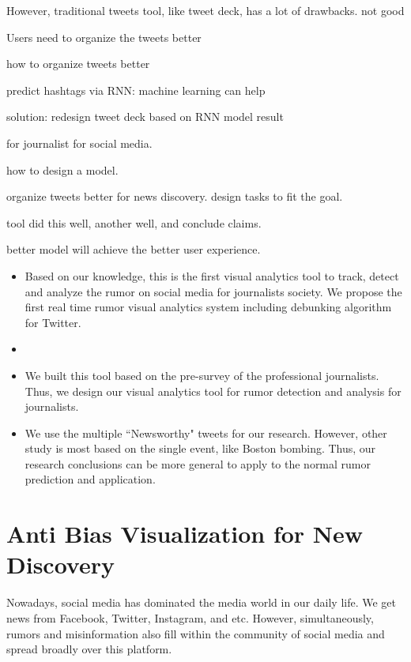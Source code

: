 However, traditional tweets tool, like tweet deck, has a lot of drawbacks.  not good

Users need to organize the tweets better

how to organize tweets better

predict hashtags via RNN: machine learning can help

solution: redesign tweet deck based on RNN model result

for journalist for social media. 

how to design a model. 



organize tweets better for news discovery. design tasks to fit the goal. 

tool did this well, another well, and conclude claims. 


better model will achieve the better user experience.  



\begin{itemize}
  \item Based on our knowledge, this is the first visual analytics tool to track, detect and analyze the rumor on social media for journalists society. We propose the first real time rumor visual analytics system including debunking algorithm for Twitter.

 \item 
  
  \item We built this tool based on the pre-survey of the professional journalists. Thus, we design our visual analytics tool for rumor detection and analysis for journalists. 
  
  \item We use the multiple ``Newsworthy" tweets for our research. However, other study is most based on the single event, like Boston bombing. Thus, our research conclusions can be more general to apply to the normal rumor prediction and application. 
\end{itemize}



\section{Anti Bias Visualization for New Discovery}

Nowadays, social media has dominated the media world in our daily life. We get news from Facebook, Twitter, Instagram, and etc. However, simultaneously, rumors and misinformation also fill within the community of social media and spread broadly over this platform.


